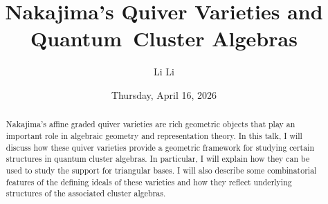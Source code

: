 \documentclass{UAmathtalk}
\author{Li Li}
\title{Nakajima’s Quiver Varieties and Quantum~Cluster Algebras}
\date{Thursday, April 16, 2026}
\begin{document}
\maketitle

\begin{abstract}
Nakajima’s affine graded quiver varieties are rich geometric objects that play an important role in algebraic geometry and representation theory. In this talk, I will discuss how these quiver varieties provide a geometric framework for studying certain structures in quantum cluster algebras. In particular, I will explain how they can be used to study the support for triangular bases. I will also describe some combinatorial features of the defining ideals of these varieties and how they reflect underlying structures of the associated cluster algebras.
\end{abstract}
\end{document}
